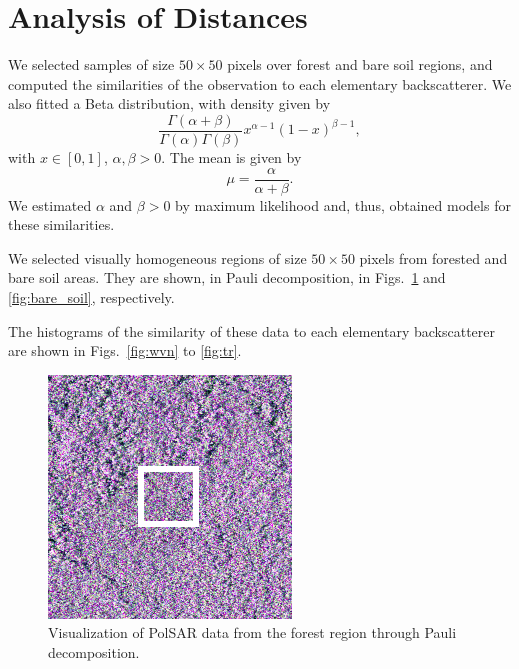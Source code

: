\documentclass[conference]{IEEEtran}
\begin{document}
\section{Analysis of Distances}

We selected samples of size $50\times 50$ pixels over forest and bare soil regions, and computed the similarities of the observation to each elementary backscatterer.
We also fitted a Beta distribution, with density given by
$$
\frac{\Gamma(\alpha+\beta)}{\Gamma(\alpha)\Gamma(\beta)}x^{\alpha-1}(1-x)^{\beta-1},
$$
with $x \in [ 0,1]$, $\alpha,\beta>0$.
The mean is given by
\begin{equation}
  \mu = \frac{\alpha}{\alpha + \beta}.
  \label{eq:MeanBeta}
\end{equation}
We estimated $\alpha$ and $\beta>0$ by maximum likelihood and, thus, obtained models for these similarities.

We selected visually homogeneous regions of size $50\times50$ pixels from forested and bare soil areas.
They are shown, in Pauli decomposition, in Figs.~\ref{fig:forest} and \ref{fig:bare_soil}, respectively.



The histograms of the similarity of these data to each elementary backscatterer are shown in Figs.~\ref{fig:wvn} to \ref{fig:tr}.


\begin{figure}[hbt]
    \vspace{.1\linewidth}
    \centering
    \includegraphics[width = .7\linewidth]{forest}
    \caption{Visualization of PolSAR data from the forest region through Pauli decomposition.}
    \label{fig:forest}
\end{figure}
\end{document}
